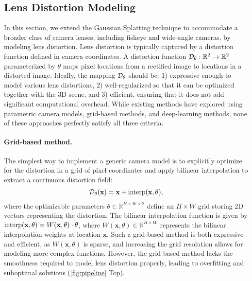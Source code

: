\subsection{Lens Distortion Modeling}
\label{sec:iresnet}
In this section, we extend the Gaussian Splatting technique to accommodate a broader class of camera lenses, including fisheye and wide-angle cameras, by modeling lens distortion.
Lens distortion is typically captured by a distortion function defined in camera coordinates.
A distortion function $\mathcal{D}_\theta:\mathbb{R}^2 \to \mathbb{R}^2$ parameterized by $\theta$ maps pixel locations from a rectified image to locations in a distorted image.
Ideally, the mapping $\mathcal{D}_\theta$ should be:
1) expressive enough to model various lens distortions,
2) well-regularized so that it can be optimized together with the 3D scene, and
3) efficient, ensuring that it does not add significant computational overhead.
While existing methods have explored using parametric camera models, grid-based methods, and deep-learning methods, none of these approaches perfectly satisfy all three criteria.



\paragraph{Grid-based method.}
The simplest way to implement a generic camera model is to explicitly optimize for the distortion in a grid of pixel coordinates and apply bilinear interpolation to extract a continuous distortion field:
\begin{align}
    \mathcal{D}_\theta(\textbf{x}) = \textbf{x} + \operatorname{interp}(\textbf{x}, \theta), 
\end{align}
where the optimizable parameters $\theta\in \mathbb{R}^{H\times W\times 2}$ define an $H\times W$ grid storing 2D vectors representing the distortion. The bilinear interpolation function is given by $\operatorname{interp}(\textbf{x}, \theta) = W(\textbf{x}, \theta)\cdot\theta$, where $W(\textbf{x}, \theta)\in \mathbb{R}^{H\times W}$ represents the bilinear interpolation weights at location $\textbf{x}$.
Such a grid-based method is both expressive and efficient, as $W(\textbf{x}, \theta)$ is sparse, and increasing the grid resolution allows for modeling more complex functions.
However, the grid-based method lacks the smoothness required to model lens distortion properly, leading to overfitting and suboptimal solutions (\cref{fig:pipeline} Top).




